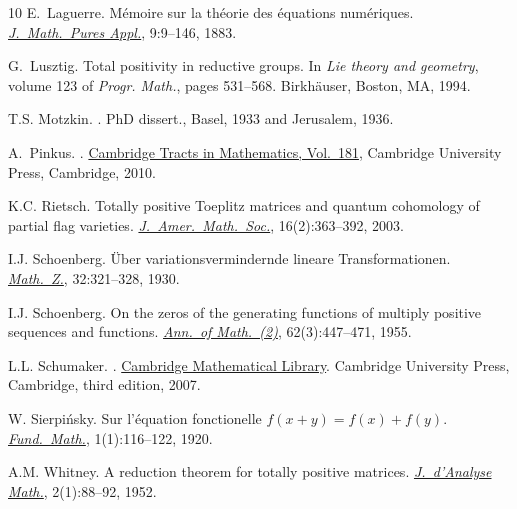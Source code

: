 \documentclass[11pt,reqno]{amsart}
\theoremstyle{plain}
\theoremstyle{definition}
\numberwithin{equation}{section}
\begin{document}
\begin{thebibliography}{10}
E.~Laguerre.
\newblock M\'emoire sur la th\'eorie des \'equations num\'eriques.
\href{http://sites.mathdoc.fr/JMPA/PDF/JMPA_1883_3_9_A5_0.pdf}{\em J.\
Math.\ Pures Appl.}, 9:9--146, 1883.

G.~Lusztig.
\newblock Total positivity in reductive groups.
\newblock In {\em Lie theory and geometry}, volume 123 of {\em Progr. Math.},
  pages 531--568. Birkh\"{a}user, Boston, MA, 1994.

T.S. Motzkin.
.
\newblock PhD dissert., Basel, 1933 and Jerusalem, 1936.

A.~Pinkus.
.
\newblock \href{http://dx.doi.org/10.1017/CBO9780511691713}{Cambridge
Tracts in Mathematics, Vol.~181}, Cambridge University Press, Cambridge,
2010.

K.C. Rietsch.
\newblock Totally positive {T}oeplitz matrices and quantum cohomology of
  partial flag varieties.
\newblock \href{http://dx.doi.org/10.1090/S0894-0347-02-00412-5}%
{\em J.\ Amer.\ Math.\ Soc.}, 16(2):363--392, 2003.



I.J. Schoenberg.
\newblock \"{U}ber variationsvermindernde lineare {T}ransformationen.
\newblock \href{http://dx.doi.org/10.1007/BF01194637}{\em Math.\ Z.},
32:321--328, 1930.

I.J. Schoenberg.
\newblock On the zeros of the generating functions of multiply positive
  sequences and functions.
\newblock \href{http://dx.doi.org/10.2307/1970073}{\em Ann.\ of Math.\
(2)}, 62(3):447--471, 1955.

L.L. Schumaker.
.
\newblock \href{https://doi.org/10.1017/CBO9780511618994}{Cambridge
Mathematical Library}. Cambridge University Press, Cambridge, third
edition, 2007.

W. Sierpi\'nsky.
\newblock Sur l'\'equation fonctionelle $f( x + y ) = f( x ) + f( y )$.
\newblock \href{http://dx.doi.org/10.4064/fm-1-1-116-122}%
{\em Fund.\ Math.}, 1(1):116--122, 1920.

A.M. Whitney.
\newblock A reduction theorem for totally positive matrices.
\newblock \href{http://dx.doi.org/10.1007/BF02786969}%
{\em J.\ d'Analyse Math.}, 2(1):88--92, 1952.

\end{thebibliography}
\end{document}
